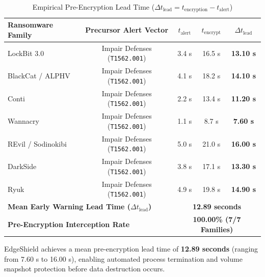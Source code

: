 \documentclass[10pt,journal,compsoc]{IEEEtran}
\begin{document}
\begin{table}[htbp]
\caption{Empirical Pre-Encryption Lead Time ($\Delta t_{\text{lead}} = t_{\text{encryption}} - t_{\text{alert}}$)}
\label{tab:ransomware_lead_time}
\centering
\begin{tabular}{lcccc}
\toprule
\textbf{Ransomware Family} & \textbf{Precursor Alert Vector} & $t_{\text{alert}}$ & $t_{\text{encrypt}}$ & $\Delta t_{\text{lead}}$ \\
\midrule
LockBit 3.0           & Impair Defenses (\texttt{T1562.001}) & 3.4 s & 16.5 s & \textbf{13.10 s} \\
BlackCat / ALPHV      & Impair Defenses (\texttt{T1562.001}) & 4.1 s & 18.2 s & \textbf{14.10 s} \\
Conti                 & Impair Defenses (\texttt{T1562.001}) & 2.2 s & 13.4 s & \textbf{11.20 s} \\
Wannacry              & Impair Defenses (\texttt{T1562.001}) & 1.1 s &  8.7 s & \textbf{7.60 s} \\
REvil / Sodinokibi    & Impair Defenses (\texttt{T1562.001}) & 5.0 s & 21.0 s & \textbf{16.00 s} \\
DarkSide              & Impair Defenses (\texttt{T1562.001}) & 3.8 s & 17.1 s & \textbf{13.30 s} \\
Ryuk                  & Impair Defenses (\texttt{T1562.001}) & 4.9 s & 19.8 s & \textbf{14.90 s} \\
\midrule
\multicolumn{2}{l}{\textbf{Mean Early Warning Lead Time ($\Delta t_{\text{lead}}$)}} & \multicolumn{3}{c}{\textbf{12.89 seconds}} \\
\multicolumn{2}{l}{\textbf{Pre-Encryption Interception Rate}} & \multicolumn{3}{c}{\textbf{100.00\% (7/7 Families)}} \\
\bottomrule
\end{tabular}
\end{table}

EdgeShield achieves a mean pre-encryption lead time of \textbf{12.89 seconds} (ranging from 7.60 s to 16.00 s), enabling automated process termination and volume snapshot protection before data destruction occurs.
\end{document}
